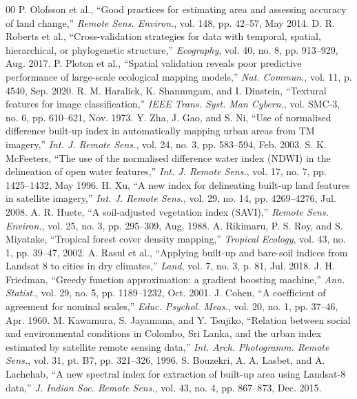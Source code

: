 \documentclass[conference]{IEEEtran}
\begin{document}
\begin{thebibliography}{00}
 P. Olofsson et al., ``Good practices for estimating area and assessing accuracy of land change,'' \textit{Remote Sens. Environ.}, vol. 148, pp. 42--57, May 2014.
 D. R. Roberts et al., ``Cross-validation strategies for data with temporal, spatial, hierarchical, or phylogenetic structure,'' \textit{Ecography}, vol. 40, no. 8, pp. 913--929, Aug. 2017.
 P. Ploton et al., ``Spatial validation reveals poor predictive performance of large-scale ecological mapping models,'' \textit{Nat. Commun.}, vol. 11, p. 4540, Sep. 2020.
 R. M. Haralick, K. Shanmugam, and I. Dinstein, ``Textural features for image classification,'' \textit{IEEE Trans. Syst. Man Cybern.}, vol. SMC-3, no. 6, pp. 610--621, Nov. 1973.
 Y. Zha, J. Gao, and S. Ni, ``Use of normalised difference built-up index in automatically mapping urban areas from TM imagery,'' \textit{Int. J. Remote Sens.}, vol. 24, no. 3, pp. 583--594, Feb. 2003.
 S. K. McFeeters, ``The use of the normalised difference water index (NDWI) in the delineation of open water features,'' \textit{Int. J. Remote Sens.}, vol. 17, no. 7, pp. 1425--1432, May 1996.
 H. Xu, ``A new index for delineating built-up land features in satellite imagery,'' \textit{Int. J. Remote Sens.}, vol. 29, no. 14, pp. 4269--4276, Jul. 2008.
 A. R. Huete, ``A soil-adjusted vegetation index (SAVI),'' \textit{Remote Sens. Environ.}, vol. 25, no. 3, pp. 295--309, Aug. 1988.
 A. Rikimaru, P. S. Roy, and S. Miyatake, ``Tropical forest cover density mapping,'' \textit{Tropical Ecology}, vol. 43, no. 1, pp. 39--47, 2002.
 A. Rasul et al., ``Applying built-up and bare-soil indices from Landsat 8 to cities in dry climates,'' \textit{Land}, vol. 7, no. 3, p. 81, Jul. 2018.
 J. H. Friedman, ``Greedy function approximation: a gradient boosting machine,'' \textit{Ann. Statist.}, vol. 29, no. 5, pp. 1189--1232, Oct. 2001.
 J. Cohen, ``A coefficient of agreement for nominal scales,'' \textit{Educ. Psychol. Meas.}, vol. 20, no. 1, pp. 37--46, Apr. 1960.
 M. Kawamura, S. Jayamana, and Y. Tsujiko, ``Relation between social and environmental conditions in Colombo, Sri Lanka, and the urban index estimated by satellite remote sensing data,'' \textit{Int. Arch. Photogramm. Remote Sens.}, vol. 31, pt. B7, pp. 321--326, 1996.
 S. Bouzekri, A. A. Lasbet, and A. Lachehab, ``A new spectral index for extraction of built-up area using Landsat-8 data,'' \textit{J. Indian Soc. Remote Sens.}, vol. 43, no. 4, pp. 867--873, Dec. 2015.

\end{thebibliography}
\end{document}
